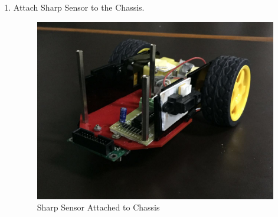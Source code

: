 \documentclass[a4paper,12pt,oneside]{book}
\begin{document}
\begin{enumerate}
	\item Attach Sharp Sensor to the Chassis.
	\begin{figure}[h]
		\centering
		\includegraphics[scale=0.16]{a_Sharp}
		\caption{Sharp Sensor Attached to Chassis}
	\end{figure}
	\newpage
	

\end{enumerate}
\end{document}
